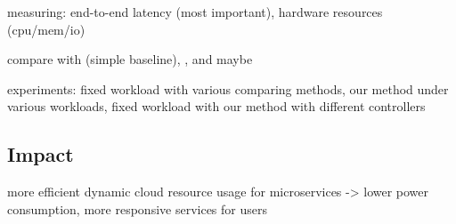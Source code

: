 \documentclass{proposal}
\begin{document}
measuring: end-to-end latency (most important), hardware resources (cpu/mem/io)

compare with \cite{kubernetes_hpa} (simple baseline), \cite{choi_phpa}, and maybe \cite{sachi_cola}

experiments: fixed workload with various comparing methods, our method under various workloads, fixed workload with our method with different controllers

\subsection{Impact}
more efficient dynamic cloud resource usage for microservices -> lower power consumption, more responsive services for users

 
\begin{small}

\end{small}
\end{document}
